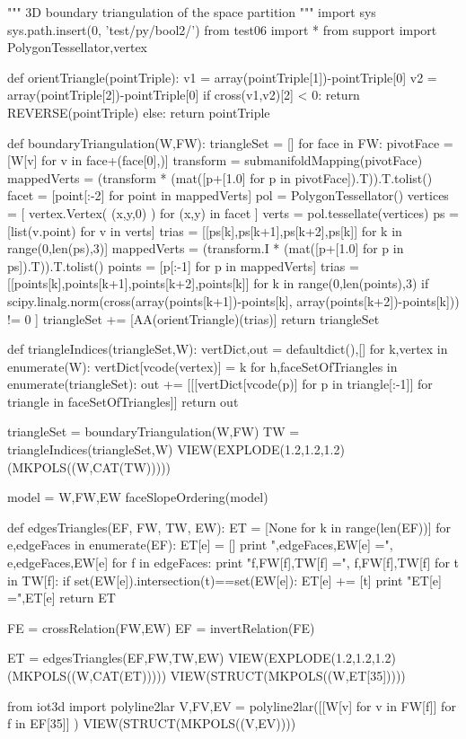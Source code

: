 """ 3D boundary triangulation of the space partition """
import sys
sys.path.insert(0, 'test/py/bool2/')
from test06 import *
from support import PolygonTessellator,vertex

def orientTriangle(pointTriple):
    v1 = array(pointTriple[1])-pointTriple[0]
    v2 = array(pointTriple[2])-pointTriple[0]
    if cross(v1,v2)[2] < 0: return REVERSE(pointTriple)
    else: return pointTriple

def boundaryTriangulation(W,FW):
    triangleSet = []
    for face in FW:
        pivotFace = [W[v] for v in face+(face[0],)]
        transform = submanifoldMapping(pivotFace)
        mappedVerts = (transform * (mat([p+[1.0] for p in pivotFace]).T)).T.tolist()
        facet = [point[:-2] for point in mappedVerts]
        pol = PolygonTessellator()
        vertices = [ vertex.Vertex( (x,y,0) ) for (x,y) in facet  ]
        verts = pol.tessellate(vertices)
        ps = [list(v.point) for v in verts]
        trias = [[ps[k],ps[k+1],ps[k+2],ps[k]] for k in range(0,len(ps),3)]
        mappedVerts = (transform.I * (mat([p+[1.0] for p in ps]).T)).T.tolist()
        points = [p[:-1] for p in mappedVerts]
        trias = [[points[k],points[k+1],points[k+2],points[k]] 
            for k in range(0,len(points),3) 
            if scipy.linalg.norm(cross(array(points[k+1])-points[k], 
                                       array(points[k+2])-points[k])) != 0 ]
        triangleSet += [AA(orientTriangle)(trias)]
    return triangleSet
    
def triangleIndices(triangleSet,W):
    vertDict,out = defaultdict(),[]
    for k,vertex in enumerate(W):  vertDict[vcode(vertex)] = k
    for h,faceSetOfTriangles in enumerate(triangleSet):
        out += [[[vertDict[vcode(p)] for p in triangle[:-1]] 
                    for triangle in faceSetOfTriangles]]
    return out

triangleSet = boundaryTriangulation(W,FW)
TW = triangleIndices(triangleSet,W)
VIEW(EXPLODE(1.2,1.2,1.2)(MKPOLS((W,CAT(TW)))))


model = W,FW,EW
faceSlopeOrdering(model)





def edgesTriangles(EF, FW, TW, EW):
    ET = [None for k in range(len(EF))]
    for e,edgeFaces in enumerate(EF):
        ET[e] = []
        print "\ne,edgeFaces,EW[e] =", e,edgeFaces,EW[e]
        for f in edgeFaces:
            print "f,FW[f],TW[f] =", f,FW[f],TW[f]
            for t in TW[f]:
                if set(EW[e]).intersection(t)==set(EW[e]):
                    ET[e] += [t]
                    print "ET[e] =",ET[e]
    return ET

FE = crossRelation(FW,EW)
EF = invertRelation(FE)

ET = edgesTriangles(EF,FW,TW,EW)
VIEW(EXPLODE(1.2,1.2,1.2)(MKPOLS((W,CAT(ET)))))
VIEW(STRUCT(MKPOLS((W,ET[35]))))

from iot3d import polyline2lar
V,FV,EV = polyline2lar([[W[v] for v in FW[f]] for f in EF[35]] )
VIEW(STRUCT(MKPOLS((V,EV))))




